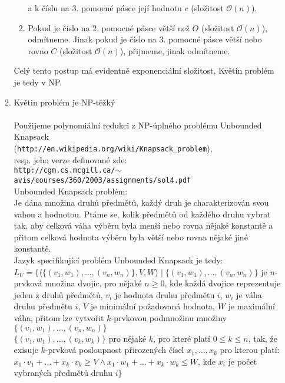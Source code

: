 \documentclass[a4paper,11pt]{article}[24.3.2010]
\begin{document}
\begin{enumerate}
\begin{enumerate}[I/]
\begin{enumerate}[1.]
 a k číslu na 3. pomocné pásce její hodnotu $c$ (složitost $\mathcal{O}(n)$).
\item Pokud je číslo na 2. pomocné pásce větší než $O$ (složitost $\mathcal{O}(n)$), odmítneme. Jinak pokud je číslo na 3. pomocné pásce větší nebo rovno $C$ (složitost $\mathcal{O}(n)$), přijmeme, jinak odmítneme.
\end{enumerate}
Celý tento postup má evidentně exponenciální složitost, Květin problém je tedy v NP.\\
\item Květin problém je NP-těžký\\\\
Použijeme polynomiální redukci z NP-úplného problému Unbounded Knapsack\\ 
(\texttt{http://en.wikipedia.org/wiki/Knapsack\_problem}),\\
 resp. jeho verze definované zde:\\ 
\texttt{http://cgm.cs.mcgill.ca/$\sim$avis/courses/360/2003/assignments/sol4.pdf}\\

Unbounded Knapsack problém:\\
Je dána množina druhů předmětů, každý druh je charakterizován svou vahou a hodnotou. Ptáme se, kolik předmětů od každého druhu vybrat tak, aby celková váha výběru byla menší nebo rovna nějaké konstantě a přitom celková hodnota výběru byla větší nebo rovna nějaké jiné konstantě.\\

Jazyk specifikující problém Unbounded Knapsack je tedy:\\ 
$L_{U}=\{\langle\{(v_{1},w_{1}),\dots,(v_{n},w_{n})\},V,W\rangle\mid\{(v_{1},w_{1}),\dots,(v_{n},w_{n})\}$ je $n$-prvková množina dvojic, pro nějaké $n\geq 0$, kde každá dvojice reprezentuje jeden z druhů předmětů, $v_{i}$ je hodnota druhu předmětu $i$, $w_{i}$ je váha druhu předmětu $i$, $V$ je minimální požadovaná hodnota, $W$ je maximální váha, přitom lze vytvořit $k$-prvkovou podmnožinu množiny $\{(v_{1},w_{1}),\dots,(v_{n},w_{n})\}$\\ $\{(v_{1},w_{1}),\dots,(v_{k},w_{k})\}$ pro nějaké $k$, pro které platí $0\leq k\leq n$, tak, že exisuje $k$-prvková posloupnost přirozených čísel $x_{1},\dots,x_{k}$ pro kterou platí: $x_{1}\cdot v_{1}+\dots+x_{k}\cdot v_{k}\geq V \wedge x_{1}\cdot w_{1}+\dots+x_{k}\cdot w_{k}\leq W$, kde $x_{i}$ je počet vybraných předmětů druhu $i\}$\\


\end{enumerate}
\end{enumerate}
\end{document}
